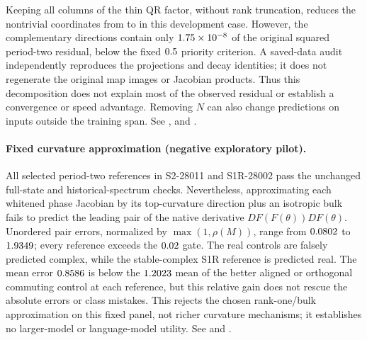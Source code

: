 \documentclass[11pt,letterpaper]{article}
\begin{document}
Keeping all \nCifarSpanColumns{} columns of the thin QR factor, without rank truncation, reduces the
nontrivial coordinates from \nCifarFullDimension{} to \nCifarActiveDimension{} in this development case.
However, the complementary directions contain only $1.75\times10^{-8}$ of the original
squared period-two residual, below the fixed $0.5$ priority criterion. A saved-data audit
independently reproduces the projections and decay identities; it does not regenerate the original map
images or Jacobian products. Thus this decomposition does not explain most of the observed residual or
establish a convergence or speed advantage. Removing $N$ can also change predictions on inputs outside
the training span. See ,
 and
.

\paragraph{Fixed curvature approximation (negative exploratory pilot).} All \nCurvatureSlots{} selected
period-two references in S2-28011 and S1R-28002 pass the unchanged full-state and historical-spectrum checks.
Nevertheless, approximating each whitened phase Jacobian by its top-curvature direction plus an isotropic
bulk fails to predict the leading pair of the native derivative $DF(F(\theta))DF(\theta)$.
Unordered pair errors, normalized by $\max(1,\rho(M))$, range from $0.0802$ to
$1.9349$; every reference exceeds the $0.02$ gate.
The \nCurvatureFalseComplex{} real controls are falsely predicted complex, while the stable-complex S1R
reference is predicted real. The mean error $0.8586$ is below the $1.2023$
mean of the better aligned or orthogonal commuting control at each reference, but this relative gain
does not rescue the absolute errors or class mistakes. This rejects the chosen rank-one/bulk approximation
on this fixed panel, not richer curvature mechanisms; it establishes no larger-model or language-model
utility. See  and
.
\end{document}
